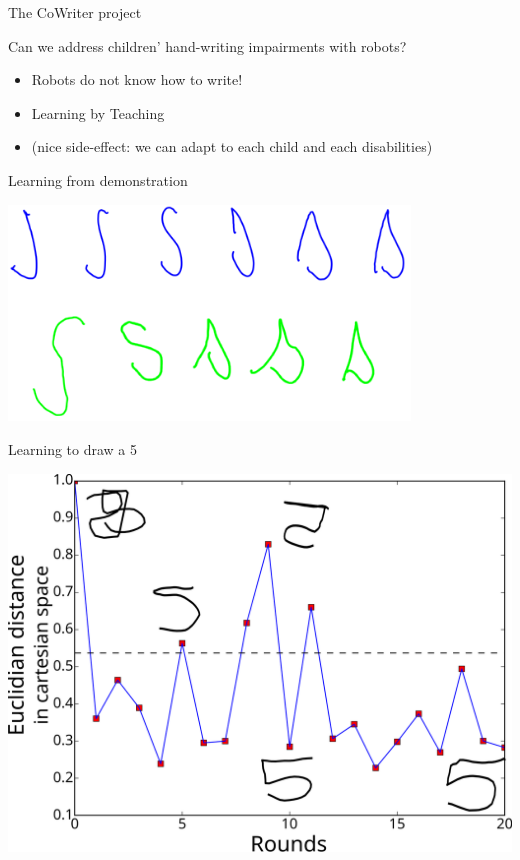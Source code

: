 \documentclass[compress]{beamer}
\begin{document}
{

\begin{frame}{The CoWriter project}

    Can we address children' hand-writing impairments with robots?

    \begin{itemize}
        \item<2-> Robots do not know how to write!
        \item<3-> Learning by Teaching
        \item<4-> (nice side-effect: we can adapt to each child and each disabilities)
    \end{itemize}
\end{frame}
}

{

\begin{frame}{Learning from demonstration}
    \begin{center}
    \includegraphics[width=0.8\textwidth]{cowriter/learningSdemo.png}
    \end{center}
\end{frame}

}

{
\begin{frame}{Learning to draw a 5}
    \begin{center}
        \includegraphics[width=0.8\linewidth]{cowriter/henry5}
    \end{center}
\end{frame}
}
\end{document}

